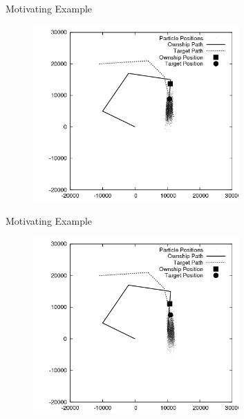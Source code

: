 \documentclass{beamer}
\begin{document}
\begin{frame}{Motivating Example}
\begin{figure}
\centering
\includegraphics[width=0.7\textwidth]{data/azimuth_only_3100.png}
\end{figure}
\end{frame}


\begin{frame}{Motivating Example}
\begin{figure}
\centering
\includegraphics[width=0.7\textwidth]{data/azimuth_only_3300.png}
\end{figure}
\end{frame}

\end{document}
